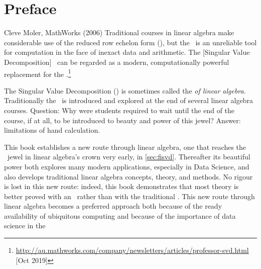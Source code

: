 \begin{comment}
To lead students to further consideration of such points, and to avoid replicating material  that is laid down well elsewhere, I have included a further reading section at the end of  each chapter. These lists of readings aim to be directive rather than exhaustive, and I hope  that any student who is interested in mathematics will read widely from such material and  thus benefit from the insights offered by a variety of experts. My sincere thanks to Keith  Mansfield and Clare Charles at Oxford University Press, to the reviewers of the original  book proposal, and to the following colleagues, friends and students who were kind  enough to give detailed and thoughtful feedback on earlier versions of this work: Nina
X X X X
\end{comment}



\tableofcontents


\chapter*{Preface}


\begin{quoted}{Cleve Moler, MathWorks (2006)}
Traditional courses in linear algebra make considerable use of the 
{reduced row echelon form} (\rref), but the \rref\ is an unreliable tool for computation in the face of inexact data and arithmetic. 
The [Singular Value Decomposition] \svd\ can be regarded as a modern, computationally powerful replacement for the \rref.\footnote{\url{http://au.mathworks.com/company/newsletters/articles/professor-svd.html} [Oct 2019]}
\end{quoted}

The Singular Value Decomposition (\svd) is sometimes called the \emph{ of linear algebra}.
Traditionally the \svd\ is introduced and explored at the end of several linear algebra courses.
Question: Why were students required to wait until the end of the course, if at all, to be introduced to beauty and power of this jewel?
Answer: limitations of hand calculation.

This book establishes a new route through linear algebra, one that reaches the \svd\ jewel in linear algebra's crown very early, in \cref{sec:fisvd}.
Thereafter its beautiful power both explores many modern applications, especially in Data Science, and also develops traditional linear algebra concepts, theory, and methods.
No rigour is lost in this new route: indeed, this book demonstrates that most theory is better proved with an \svd\ rather than with the traditional \rref.
This new route through linear algebra becomes a preferred approach both because of the ready availability of ubiquitous computing and because of the importance of data science in the 


